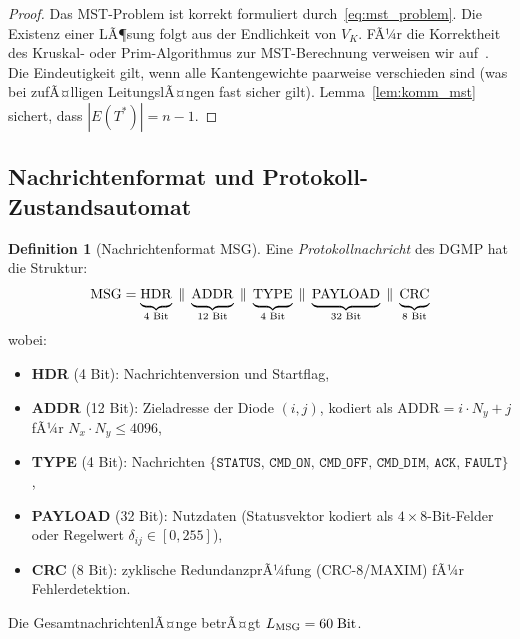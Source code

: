 ﻿\documentclass[a4paper,12pt]{article}
\theoremstyle{definition}
\newtheorem{definition}{Definition}[section]
\theoremstyle{remark}
\begin{document}
\begin{proof}
Das MST-Problem ist korrekt formuliert durch~\eqref{eq:mst_problem}. Die
Existenz einer LÃ¶sung folgt aus der Endlichkeit von $V_K$. FÃ¼r die
Korrektheit des Kruskal- oder Prim-Algorithmus zur MST-Berechnung verweisen
wir auf~\cite{Korte2012}. Die Eindeutigkeit gilt, wenn alle Kantengewichte
paarweise verschieden sind (was bei zufÃ¤lligen LeitungslÃ¤ngen fast sicher gilt).
Lemma~\ref{lem:komm_mst} sichert, dass $|E(T^*)| = n-1$.
\end{proof}

\subsection{Nachrichtenformat und Protokoll-Zustandsautomat}
\label{sec:komm_fsm}

\begin{definition}[Nachrichtenformat MSG]
\label{def:msg}
Eine \emph{Protokollnachricht} des DGMP hat die Struktur:
\begin{equation}
  \mathrm{MSG} = \underbrace{\vphantom{|}\mathrm{HDR}}_{\text{4 Bit}}
               \;\|\; \underbrace{\vphantom{|}\mathrm{ADDR}}_{\text{12 Bit}}
               \;\|\; \underbrace{\vphantom{|}\mathrm{TYPE}}_{\text{4 Bit}}
               \;\|\; \underbrace{\vphantom{|}\mathrm{PAYLOAD}}_{\text{32 Bit}}
               \;\|\; \underbrace{\vphantom{|}\mathrm{CRC}}_{\text{8 Bit}}
  \label{eq:msgformat}
\end{equation}
wobei:
\begin{itemize}
  \item \textbf{HDR} (4 Bit): Nachrichtenversion und Startflag,
  \item \textbf{ADDR} (12 Bit): Zieladresse der Diode $(i,j)$,
        kodiert als $\mathrm{ADDR} = i \cdot N_y + j$ fÃ¼r $N_x \cdot N_y \leq 4096$,
  \item \textbf{TYPE} (4 Bit): Nachrichten $\{\mathtt{STATUS},\,\mathtt{CMD\_ON},\,\mathtt{CMD\_OFF},\,
           \mathtt{CMD\_DIM},\,\mathtt{ACK},\,\mathtt{FAULT}\}$,
  \item \textbf{PAYLOAD} (32 Bit): Nutzdaten (Statusvektor kodiert
        als $4 \times 8$-Bit-Felder oder Regelwert $\delta_{ij} \in [0,255]$),
  \item \textbf{CRC} (8 Bit): zyklische RedundanzprÃ¼fung (CRC-8/MAXIM)
        fÃ¼r Fehlerdetektion.
\end{itemize}
Die GesamtnachrichtenlÃ¤nge betrÃ¤gt $L_{\rm MSG} = 60\;\mathrm{Bit}$.
\end{definition}
\end{document}
